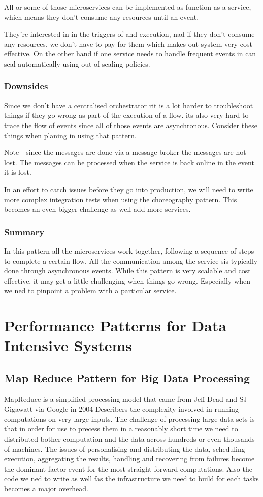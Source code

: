 All or some of those microservices can be implemented as function as a service, which means they don't consume any resources until an event.

They're interested in in the triggers of and execution, nad if they don't consume any resources, we don't have to pay for them which makes out system very cost effective.
On the other hand if one service needs to handle frequent events in can scal automatically using out of scaling policies.

\subsubsection{Downsides}
Since we don't have a centralised orchestrator rit is a lot harder to troubleshoot things if they go wrong as part of the execution of a flow.
its also very hard to trace the flow of events since all of those events are asynchronous.
Consider these things when planing in using that pattern.

Note - since the messages are done via a message broker the messages are not lost.
The messages can be processed when the service is back online in the event it is lost.

In an effort to catch issues before they go into production, we will need to write more complex integration tests when using the choreography pattern.
This becomes an even bigger challenge as well add more services.

\subsubsection{Summary}
In this pattern all the microservices work together, following a sequence of steps to complete a certain flow.
All the communication among the service sis typically done through asynchronous events.
While this pattern is very scalable and cost effective, it may get a little challenging when things go wrong.
Especially when we ned to pinpoint a problem with a particular service.

\section{Performance Patterns for Data Intensive Systems}

\subsection{Map Reduce Pattern for Big Data Processing}
MapReduce is a simplified processing model that came from Jeff Dead and SJ Gigawatt via Google in 2004
Describers the complexity involved in running computations on very large inputs.
The challenge of processing large data sets is that in order for use to precess them in a reasonably short time we need to distributed bother computation and the data across hundreds or even thousands of machines.
The issues of personalising and distributing the data, scheduling execution, aggregating the results, handling and recovering from failures become the dominant factor event for the most straight forward computations.
Also the code we ned to write as well fas the infrastructure we need to build for each tasks becomes a major overhead.

